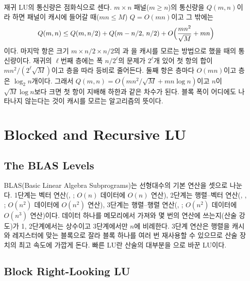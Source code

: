 재귀 LU의 통신량은 점화식으로 센다. $m\times n$ 패널($m\ge n$)의 통신량을 $Q(m,n)$이라 하면 패널이 캐시에 들어갈 때($mn\le M$) $Q=O(mn)$이고 그 밖에는
\[
Q(m,n)\le Q(m,n/2)+Q(m-n/2,\,n/2)+O\Bigl(\frac{mn^2}{\sqrt M}+mn\Bigr)
\]
이다. 마지막 항은 크기 $m\times n/2\times n/2$의 과 을 캐시를 모르는 방법으로 했을 때의 통신량이다. 재귀의 $\ell$번째 층에는 폭 $n/2^\ell$의 문제가 $2^\ell$개 있어 첫 항의 합이 $mn^2/(2^\ell\sqrt M)$이고 층을 따라 등비로 줄어든다. 둘째 항은 층마다 $O(mn)$이고 층은 $\log_2n$개이다. 그래서 $Q(m,n)=O(mn^2/\sqrt M+mn\log n)$이고 $n$이 $\sqrt M\log n$보다 크면 첫 항이 지배해 하한과 같은 차수가 된다\cite{toledo1997recursive}. 블록 폭이 어디에도 나타나지 않는다는 것이 캐시를 모르는 알고리즘의 뜻이다.

\section{Blocked and Recursive LU}
\label{sec:lu-blocked}

\subsection{The BLAS Levels}

BLAS(Basic Linear Algebra Subprograms)는 선형대수의 기본 연산을 셋으로 나눈다\cite{lawson1979blas1,dongarra1990blas3}. 1단계는 벡터 연산(, ; $O(n)$ 데이터에 $O(n)$ 연산), 2단계는 행렬–벡터 연산(, , ; $O(n^2)$ 데이터에 $O(n^2)$ 연산), 3단계는 행렬–행렬 연산(, ; $O(n^2)$ 데이터에 $O(n^3)$ 연산)이다. 데이터 하나를 메모리에서 가져와 몇 번의 연산에 쓰는지(산술 강도)가 1, 2단계에서는 상수이고 3단계에서만 $n$에 비례한다. 3단계 연산은 행렬을 캐시와 레지스터에 맞는 블록으로 잘라 블록 하나를 여러 번 재사용할 수 있으므로 산술 장치의 최고 속도에 가깝게 돈다. 빠른 LU란 산술의 대부분을 으로 바꾼 LU이다.

\subsection{Block Right-Looking LU}

